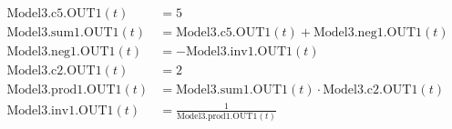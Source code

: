 \documentclass{article}
\begin{document}
\[
\begin{aligned}
\mathrm{Model3.c5.OUT1}(t) &= 5 \\[4pt]
\mathrm{Model3.sum1.OUT1}(t) &= \mathrm{Model3.c5.OUT1}(t) + \mathrm{Model3.neg1.OUT1}(t) \\[4pt]
\mathrm{Model3.neg1.OUT1}(t) &= -\mathrm{Model3.inv1.OUT1}(t) \\[4pt]
\mathrm{Model3.c2.OUT1}(t) &= 2 \\[4pt]
\mathrm{Model3.prod1.OUT1}(t) &= \mathrm{Model3.sum1.OUT1}(t) \cdot \mathrm{Model3.c2.OUT1}(t) \\[4pt]
\mathrm{Model3.inv1.OUT1}(t) &= \frac{1}{\mathrm{Model3.prod1.OUT1}(t)}
\end{aligned}
\]
\end{document}
